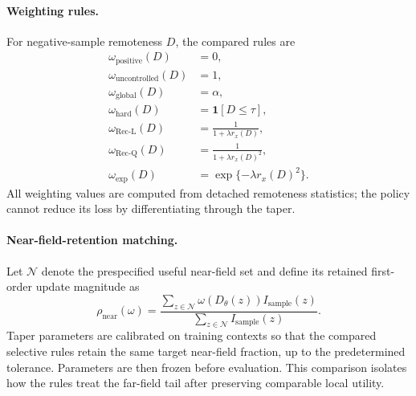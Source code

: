 \documentclass{article}
\theoremstyle{plain}
\theoremstyle{definition}
\theoremstyle{remark}
\begin{document}
\paragraph{Weighting rules.}
For negative-sample remoteness $D$, the compared rules are
\begin{equation}
\begin{aligned}
    \omega_{\mathrm{positive}}(D)
    &=0,\\
    \omega_{\mathrm{uncontrolled}}(D)
    &=1,\\
    \omega_{\mathrm{global}}(D)
    &=\alpha,\\
    \omega_{\mathrm{hard}}(D)
    &=
    \mathbf 1[D\leq\tau],\\
    \omega_{\mathrm{Rec\text{-}L}}(D)
    &=
    \frac{1}{1+\lambda r_x(D)},\\
    \omega_{\mathrm{Rec\text{-}Q}}(D)
    &=
    \frac{1}{1+\lambda r_x(D)^2},\\
    \omega_{\mathrm{exp}}(D)
    &=
    \exp\{-\lambda r_x(D)^2\}.
\end{aligned}
\label{eq:controlled_taper_rules}
\end{equation}
All weighting values are computed from detached remoteness statistics;
the policy cannot reduce its loss by differentiating through the taper.

\paragraph{Near-field-retention matching.}
Let $\mathcal N$ denote the prespecified useful near-field set and define
its retained first-order update magnitude as
\begin{equation}
    \rho_{\mathrm{near}}(\omega)
    =
    \frac{
        \sum_{z\in\mathcal N}
        \omega(D_\theta(z))
        I_{\mathrm{sample}}(z)
    }{
        \sum_{z\in\mathcal N}
        I_{\mathrm{sample}}(z)
    }.
    \label{eq:near_retention}
\end{equation}
Taper parameters are calibrated on training contexts so that the
compared selective rules retain the same target near-field fraction,
up to the predetermined tolerance. Parameters are then frozen before
evaluation. This comparison isolates how the rules treat the far-field
tail after preserving comparable local utility.
\end{document}
